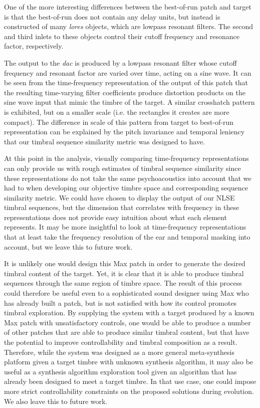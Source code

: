 \documentclass[12pt]{report} 	%
\numberwithin{figure}{chapter}
\numberwithin{table}{chapter}
\numberwithin{equation}{chapter}
\begin{document}
\begin{flushleft}
One of the more interesting differences between the best-of-run patch and target is that the best-of-run does not contain any delay units, but instead is constructed of many \textit{lores\texttildelow{}} objects, which are lowpass resonant filters. The second and third inlets to these objects control their cutoff frequency and resonance factor, respectively.

The output to the \textit{dac\texttildelow{}} is produced by a lowpass resonant filter whose cutoff frequency and resonant factor are varied over time, acting on a sine wave. It can be seen from the time-frequency representation of the output of this patch that the resulting time-varying filter coefficients produce distortion products on the sine wave input that mimic the timbre of the target. A similar crosshatch pattern is exhibited, but on a smaller scale (i.e. the rectangles it creates are more compact). The difference in scale of this pattern from target to best-of-run representation can be explained by the pitch invariance and temporal leniency that our timbral sequence similarity metric was designed to have.

At this point in the analysis, visually comparing time-frequency representations can only provide us with rough estimates of timbral sequence similarity since these representations do not take the same psychoacoustics into account that we had to when developing our objective timbre space and corresponding sequence similarity metric. We could have chosen to display the output of our NLSE timbral sequences, but the dimension that correlates with frequency in these representations does not provide easy intuition about what each element represents. It may  be more insightful to look at time-frequency representations that at least take the frequency resolution of the ear and temporal masking into account, but we leave this to future work.

It is unlikely one would design this Max patch in order to generate the desired timbral content of the target. Yet, it is clear that it is able to produce timbral sequences through the same region of timbre space. The result of this process could therefore be useful even to a sophisticated sound designer using Max who has already built a patch, but is not satisfied with how its control promotes timbral exploration. By supplying the system with a target produced by a known Max patch with unsatisfactory controls, one would be able to produce a number of other patches that are able to produce similar timbral content, but that have the potential to improve controllability and timbral composition as a result. Therefore, while the system was designed as a more general meta-synthesis platform given a target timbre with unknown synthesis algorithm, it may also be useful as a synthesis algorithm exploration tool given an algorithm that has already been designed to meet a target timbre. In that use case, one could impose more strict controllability constraints on the proposed solutions during evolution. We also leave this to future work.


\end{flushleft}
\end{document}
